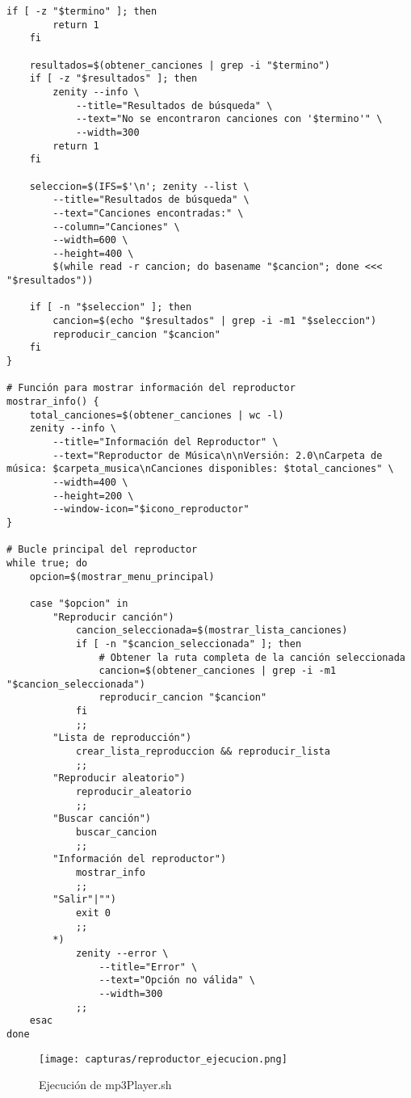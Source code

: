 \documentclass[12pt]{article}
\begin{document}
\begin{lstlisting}[caption={mp3Player.sh}]
    if [ -z "$termino" ]; then
        return 1
    fi
    
    resultados=$(obtener_canciones | grep -i "$termino")
    if [ -z "$resultados" ]; then
        zenity --info \
            --title="Resultados de búsqueda" \
            --text="No se encontraron canciones con '$termino'" \
            --width=300
        return 1
    fi
    
    seleccion=$(IFS=$'\n'; zenity --list \
        --title="Resultados de búsqueda" \
        --text="Canciones encontradas:" \
        --column="Canciones" \
        --width=600 \
        --height=400 \
        $(while read -r cancion; do basename "$cancion"; done <<< "$resultados"))
    
    if [ -n "$seleccion" ]; then
        cancion=$(echo "$resultados" | grep -i -m1 "$seleccion")
        reproducir_cancion "$cancion"
    fi
}

# Función para mostrar información del reproductor
mostrar_info() {
    total_canciones=$(obtener_canciones | wc -l)
    zenity --info \
        --title="Información del Reproductor" \
        --text="Reproductor de Música\n\nVersión: 2.0\nCarpeta de música: $carpeta_musica\nCanciones disponibles: $total_canciones" \
        --width=400 \
        --height=200 \
        --window-icon="$icono_reproductor"
}

# Bucle principal del reproductor
while true; do
    opcion=$(mostrar_menu_principal)
    
    case "$opcion" in
        "Reproducir canción")
            cancion_seleccionada=$(mostrar_lista_canciones)
            if [ -n "$cancion_seleccionada" ]; then
                # Obtener la ruta completa de la canción seleccionada
                cancion=$(obtener_canciones | grep -i -m1 "$cancion_seleccionada")
                reproducir_cancion "$cancion"
            fi
            ;;
        "Lista de reproducción")
            crear_lista_reproduccion && reproducir_lista
            ;;
        "Reproducir aleatorio")
            reproducir_aleatorio
            ;;
        "Buscar canción")
            buscar_cancion
            ;;
        "Información del reproductor")
            mostrar_info
            ;;
        "Salir"|"")
            exit 0
            ;;
        *)
            zenity --error \
                --title="Error" \
                --text="Opción no válida" \
                --width=300
            ;;
    esac
done
\end{lstlisting}

\begin{figure}[H]
    \centering
    \texttt{[image: capturas/reproductor\_ejecucion.png]}
    \caption{Ejecución de mp3Player.sh}
\end{figure}
\end{document}
